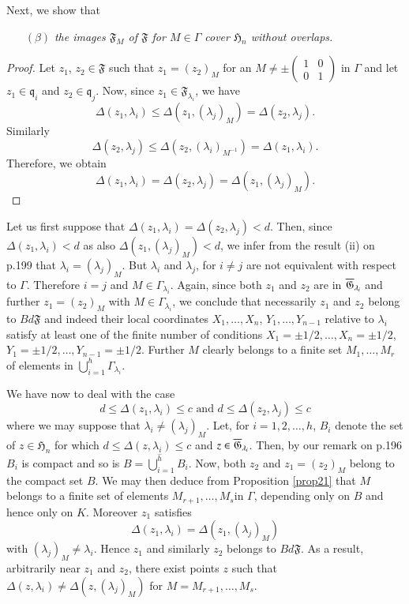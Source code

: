 Next, we show that
\begin{itemize}
\item[$(\beta)$] {\em the images $\mathfrak{F}_{M}$ of $\mathfrak{F}$
  for $M\in\Gamma$ cover $\mathfrak{H}_{n}$ without overlaps.}
\end{itemize}

\begin{proof}
Let $z_{1}$, $z_{2}\in\mathfrak{F}$ such that $z_{1}=(z_{2})_{M}$ for
an $M\neq \pm\left(\begin{smallmatrix} 1 & 0\\ 0 & 1
\end{smallmatrix}\right)$ in $\Gamma$ and let
$z_{1}\in\mathfrak{q}_{i}$ and $z_{2}\in\mathfrak{q}_{j}$. Now, since
$z_{1}\in\mathfrak{F}_{\lambda_{i}}$, we have
$$
\Delta(z_{1},\lambda_{i})\leq
\Delta(z_{1},(\lambda_{j})_{M})=\Delta(z_{2},\lambda_{j}).
$$
Similarly
$$
\Delta(z_{2},\lambda_{j})\leq
\Delta(z_{2},(\lambda_{i})_{M^{-1}})=\Delta(z_{1},\lambda_{i}).
$$
Therefore, we obtain
$$
\Delta(z_{1},\lambda_{i})=\Delta(z_{2},\lambda_{j})=\Delta(z_{1},(\lambda_{j})_{M}).
$$
\end{proof}

Let us first suppose that
$\Delta(z_{1},\lambda_{i})=\Delta(z_{2},\lambda_{j})<d$. Then, since
$\Delta(z_{1},\lambda_{i})<d$ as also
$\Delta(z_{1},(\lambda_{j})_{M})<d$, we infer from the result (ii) on
p.\@ 199 that $\lambda_{i}=(\lambda_{j})_{M}$. But $\lambda_{i}$ and
$\lambda_{j}$, for $i\neq j$ are not equivalent with respect to
$\Gamma$. Therefore $i=j$ and $M\in\Gamma_{\lambda_{i}}$. Again, since
both $z_{1}$ and $z_{2}$ are in $\overline{\mathfrak{G}}_{\lambda_{i}}$ and
further $z_{1}=(z_{2})_{M}$ with $M\in\Gamma_{\lambda_{i}}$, we
conclude that necessarily $z_{1}$ and $z_{2}$ belong to
$Bd\mathfrak{F}$ and indeed their local coordinates
$X_{1},\ldots,X_{n}$, $Y_{1},\ldots,Y_{n-1}$ relative to $\lambda_{i}$
satisfy at least one of the finite number of conditions $X_{1}=\pm
1/2,\ldots,X_{n}=\pm 1/2$, $Y_{1}=\pm 1/2,\ldots,Y_{n-1}=\pm
1/2$. Further $M$ clearly belongs to a finite set $M_{1},\ldots,M_{r}$
of elements in $\bigcup\limits^{h}_{i=1}\Gamma_{\lambda_{i}}$.

We have now to deal with the case
$$
d\leq \Delta(z_{1},\lambda_{i})\leq c\text{ \ and \ } d\leq
\Delta(z_{2},\lambda_{j})\leq c
$$
where we may suppose that $\lambda_{i}\neq (\lambda_{j})_{M}$. Let,
for $i=1,2,\ldots,h$, $B_{i}$ denote the set of $z\in\mathfrak{H}_{n}$
for which $d\leq \Delta(z,\lambda_{i})\leq c$ and
$z\in\overline{\mathfrak{G}}_{\lambda_{i}}$. Then, by our remark on p.\@ 196
$B_{i}$ is compact and so is
$B=\bigcup\limits^{\hat{h}}_{i=1}B_{i}$. Now, both $z_{2}$ and
$z_{1}=(z_{2})_{M}$ belong to the compact set $B$. We may then deduce
from Proposition \ref{prop21} that $M$ belongs to a finite set of
elements $M_{r+1},\ldots,M_{s}$\pageoriginale in $\Gamma$, depending
only on $B$ and hence only on $K$. Moreover $z_{1}$ satisfies
$$
\Delta(z_{1},\lambda_{i})=\Delta(z_{1},(\lambda_{j})_{M})
$$
with $(\lambda_{j})_{M}\neq\lambda_{i}$. Hence $z_{1}$ and similarly
$z_{2}$ belongs to $Bd\mathfrak{F}$. As a result, arbitrarily near
$z_{1}$ and $z_{2}$, there exist points $z$ such that
$\Delta(z,\lambda_{i})\neq \Delta(z,(\lambda_{j})_{M})$ for
$M=M_{r+1},\ldots,M_{s}$. 

